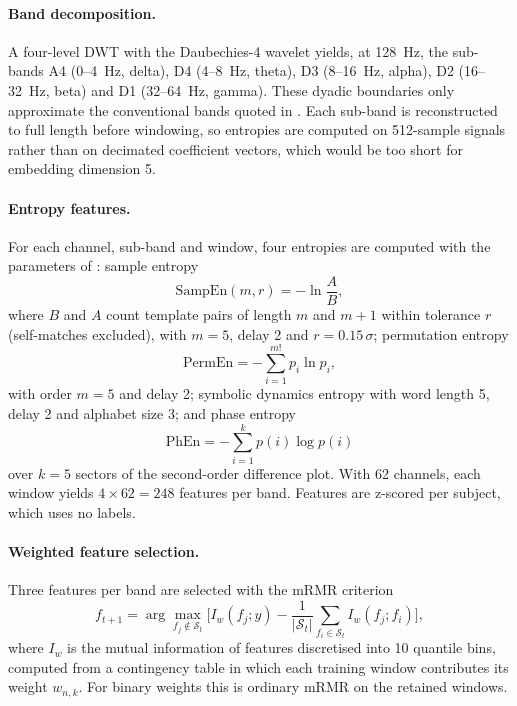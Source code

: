 \paragraph{Band decomposition.} A four-level DWT with the Daubechies-4 wavelet \cite{Mallat1989} yields, at 128~Hz, the sub-bands A4 (0--4~Hz, delta), D4 (4--8~Hz, theta), D3 (8--16~Hz, alpha), D2 (16--32~Hz, beta) and D1 (32--64~Hz, gamma). These dyadic boundaries only approximate the conventional bands quoted in \cite{FarhadiSedehi2024a}. Each sub-band is reconstructed to full length before windowing, so entropies are computed on 512-sample signals rather than on decimated coefficient vectors, which would be too short for embedding dimension 5.

\paragraph{Entropy features.} For each channel, sub-band and window, four entropies are computed with the parameters of \cite{FarhadiSedehi2024a}: sample entropy \cite{Richman2000}
\begin{equation}
\mathrm{SampEn}(m,r) = -\ln\frac{A}{B},
\end{equation}
where $B$ and $A$ count template pairs of length $m$ and $m+1$ within tolerance $r$ (self-matches excluded), with $m=5$, delay 2 and $r=0.15\,\sigma$; permutation entropy \cite{Bandt2002}
\begin{equation}
\mathrm{PermEn} = -\sum_{i=1}^{m!} p_i \ln p_i,
\end{equation}
with order $m=5$ and delay 2; symbolic dynamics entropy \cite{Zebrowski2000} with word length 5, delay 2 and alphabet size 3; and phase entropy \cite{Rohila2019}
\begin{equation}
\mathrm{PhEn} = -\sum_{i=1}^{k} p(i)\log p(i)
\end{equation}
over $k=5$ sectors of the second-order difference plot. With 62 channels, each window yields $4\times62=248$ features per band. Features are z-scored per subject, which uses no labels.

\paragraph{Weighted feature selection.} Three features per band are selected with the mRMR criterion \cite{Peng2005}
\begin{equation}
f_{t+1} = \arg\max_{f_j\notin\mathcal{S}_t}\Big[I_w(f_j;y) - \frac{1}{|\mathcal{S}_t|}\sum_{f_i\in\mathcal{S}_t} I_w(f_j;f_i)\Big],
\label{eq:mrmr}
\end{equation}
where $I_w$ is the mutual information of features discretised into 10 quantile bins, computed from a contingency table in which each training window contributes its weight $w_{n,k}$. For binary weights this is ordinary mRMR on the retained windows.

